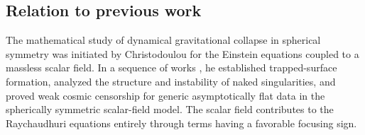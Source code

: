 \documentclass{article}[11pt]
\numberwithin{equation}{section}
\begin{document}
\vspace{3mm}
\noindent



\subsection{Relation to previous work}

The mathematical study of dynamical gravitational collapse in spherical
symmetry was initiated by Christodoulou for the Einstein equations coupled
to a massless scalar field. In a sequence of works
\cite{C91,C93,C94,C99}, he established trapped-surface formation,
analyzed the structure and instability of naked singularities, and proved
weak cosmic censorship for generic asymptotically flat data in the
spherically symmetric scalar-field model. The scalar field contributes to
the Raychaudhuri equations entirely through terms having a favorable
focusing sign.
\end{document}
